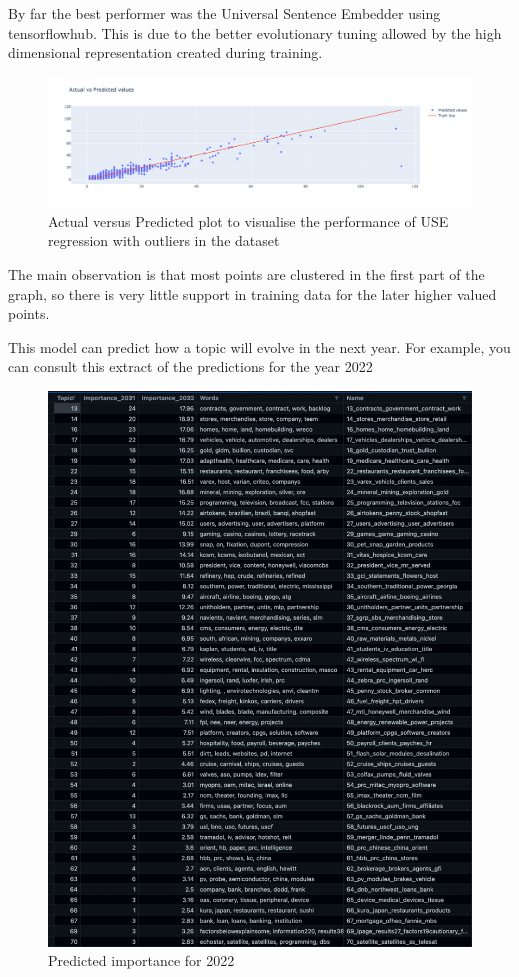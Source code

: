 \documentclass[12pt,MSc,a4paper,oneside]{muthesis}
\begin{document}
    By far the best performer was the Universal Sentence Embedder using tensorflowhub. This is due to the better evolutionary tuning allowed by the high dimensional representation created during training. \\
    \begin{figure}[h]
      \centering
      \includegraphics[scale=0.25]{results/Regression result.png}
      \caption{Actual versus Predicted plot to visualise the performance of USE regression with outliers in the dataset}
    \end{figure}

    The main observation is that most points are clustered in the first part of the graph, so there is very little support in training data for the later higher valued points.

    This model can predict how a topic will evolve in the next year. For example, you can consult this extract of the predictions for the year 2022
    \begin{figure}[h]
      \centering
      \includegraphics[scale=0.6]{results/result_regression_2022.png}
      \caption{Predicted importance for 2022}
    \end{figure}
\end{document}
